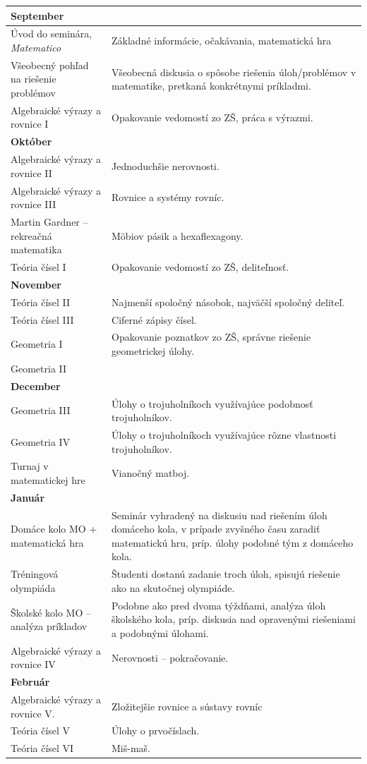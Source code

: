 \documentclass[11pt,a4paper,oneside,final]{book}
\begin{document}
\begin{tabularx}{\textwidth}{X X}
\textbf{September} & \\
\hline
Úvod do seminára, \textit{Matematico} & Základné informácie, očakávania, matematická hra\\
\hline
Všeobecný pohľad na riešenie problémov & Všeobecná diskusia o spôsobe riešenia úloh/problémov v matematike, pretkaná konkrétnymi príkladmi. \\
\hline
Algebraické výrazy a rovnice I & Opakovanie vedomostí zo ZŠ, práca s výraz\-mi.\\
\hline
\textbf{Október} & \\
\hline
Algebraické výrazy a rovnice II & Jednoduchšie nerovnosti. \\
\hline
Algebraické výrazy a rovnice III & Rovnice a systémy rovníc.\\
\hline
Martin Gardner -- rekreačná matematika &  Möbiov pásik a hexaflexagony.\\
\hline
Teória čísel I& Opakovanie vedomostí zo ZŠ, deliteľnosť.\\
\hline
\textbf{November} & \\
\hline
Teória čísel II & Najmenší spoločný násobok, najväčší spoločný deliteľ. \\
\hline
Teória čísel III & Ciferné zápisy čísel.\\
\hline
Geometria I & Opakovanie poznatkov zo ZŠ, správne riešenie geometrickej úlohy. \\
\hline
Geometria II & \\
\hline
\textbf{December} & \\
\hline
Geometria III & Úlohy o trojuholníkoch využívajúce podobnosť trojuholníkov.\\
\hline
Geometria IV & Úlohy o trojuholníkoch využívajúce rôzne vlastnosti trojuholníkov.\\
\hline
Turnaj v matematickej hre & Vianočný matboj.\\
\hline
\textbf{Január} & \\
\hline
Domáce kolo MO + matematická hra & Seminár vyhradený na diskusiu nad riešením úloh domáceho kola, v prípade zvyšného času zaradiť matematickú hru, príp. úlohy podobné tým z domáceho kola.\\
\hline
Tréningová olympiáda & Študenti dostanú zadanie troch úloh, spisujú riešenie ako na skutočnej olympiáde.\\
\hline
Školské kolo MO -- analýza príkladov & Podobne ako pred dvoma týždňami, analýza úloh školského kola, príp. diskusia nad opravenými riešeniami a podobnými úlohami.\\
\hline
Algebraické výrazy a rovnice IV& Nerovnosti -- pokračovanie. \\
\hline
\textbf{Február} & \\
\hline
Algebraické výrazy a rovnice V. & Zložitejšie rovnice a sústavy rovníc\\
\hline
Teória čísel V & Úlohy o prvočíslach.\\
\hline
Teória čísel VI & Miš-maš.\\
\hline
\end{tabularx}
\end{document}
